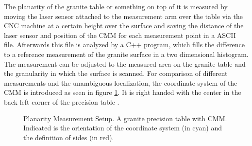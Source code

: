 \documentclass[
a4paper,                                %
twoside,                                %
BCOR1.4cm,                      %
10pt,                           %
headings=normal,                %
headsepline,                    %
clearplainpage, %
final,                                  %
div=14,
parskip=full,
openright,
bibliography=toc
]{scrreprt}
\begin{document}
The planarity of the granite table or something on top of it is measured by moving the laser sensor attached to the  measurement arm over the table via the CNC machine at a certain height over the surface and saving the distance of the laser sensor and position of the CMM for each measurement point in a ASCII file. Afterwards this file is analyzed by a C++ program, which fills the difference to a reference measurement of the granite surface in a two dimensional histogram. The measurement can be adjusted to the measured area on the granite table and the granularity in which the surface is scanned. For comparison of different measurements and the unambiguous localization, the coordinate system of the CMM is introduced as seen in figure \ref{coordsys}. It is right handed with the center in the back left corner of the precision table
. 

\begin{figure}[H]
	\caption{Planarity Measurement Setup. A granite precision table with CMM. Indicated is the orientation of the coordinate system (in cyan) and the definition of sides (in red).}
	\label{coordsys}
\end{figure}
\end{document}
